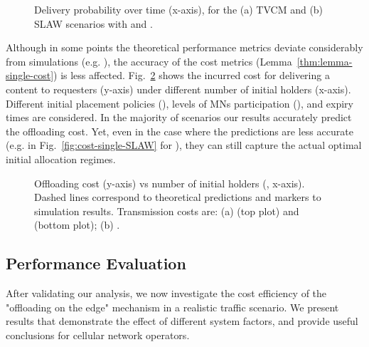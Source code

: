 \documentclass[10pt,conference,letterpaper]{IEEEtran}
\begin{document}
\begin{figure}
\caption{Delivery probability  over time  (x-axis), for the (a) TVCM and (b) SLAW scenarios with  and .}
\label{fig:traces-Prob}
\end{figure}



Although in some points the theoretical performance metrics deviate considerably from simulations (e.g. ), the accuracy of the cost metrics (Lemma~\ref{thm:lemma-single-cost}) is less affected. Fig.~\ref{fig:cost-single} shows the incurred cost for delivering a content to  requesters (y-axis) under different number of initial holders  (x-axis). Different initial placement policies (), levels of MNs participation (), and expiry times   are considered. In the majority of scenarios our results accurately predict the offloading cost. Yet, even in the case where the predictions are less accurate (e.g. in Fig.~\ref{fig:cost-single-SLAW} for ), they can still capture the actual optimal initial allocation regimes.


\begin{figure}
\caption{Offloading cost (y-axis) vs number of initial holders (, x-axis). Dashed lines correspond to theoretical predictions and markers to simulation results. Transmission costs are: (a)  (top plot) and  (bottom plot); (b) .}
\label{fig:cost-single}
\end{figure}

\subsection{Performance Evaluation}\label{sec:simulation-cost-efficiency}
After validating our analysis, we now investigate the cost efficiency of the "offloading on the edge" mechanism in a realistic traffic scenario. We present results that demonstrate the effect of different system factors, and provide useful conclusions for cellular network operators.
\end{document}

